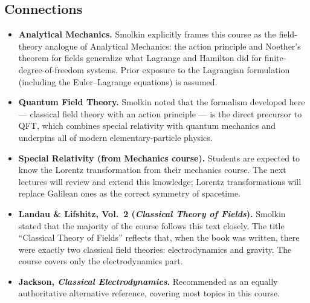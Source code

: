 
\subsection*{Connections}

\begin{itemize}
  \item \textbf{Analytical Mechanics.}  Smolkin explicitly frames this
    course as the field-theory analogue of Analytical Mechanics: the
    action principle and Noether's theorem for fields generalize what
    Lagrange and Hamilton did for finite-degree-of-freedom systems.
    Prior exposure to the Lagrangian formulation (including the
    Euler–Lagrange equations) is assumed.
  \item \textbf{Quantum Field Theory.}  Smolkin noted that the
    formalism developed here — classical field theory with an action
    principle — is the direct precursor to QFT, which combines
    special relativity with quantum mechanics and underpins all of
    modern elementary-particle physics.
  \item \textbf{Special Relativity (from Mechanics course).}
    Students are expected to know the Lorentz transformation from
    their mechanics course.  The next lectures will review and extend
    this knowledge; Lorentz transformations will replace Galilean ones
    as the correct symmetry of spacetime.
  \item \textbf{Landau \& Lifshitz, Vol.\ 2 (\emph{Classical Theory of
    Fields}).}  Smolkin stated that the majority of the course follows
    this text closely.  The title ``Classical Theory of Fields'' reflects
    that, when the book was written, there were exactly two classical
    field theories: electrodynamics and gravity.  The course covers only
    the electrodynamics part.
  \item \textbf{Jackson, \emph{Classical Electrodynamics}.}
    Recommended as an equally authoritative alternative reference,
    covering most topics in this course.
\end{itemize}

